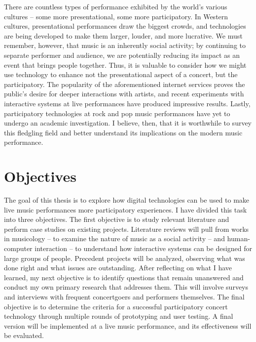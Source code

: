 There are countless types of performance exhibited by the world's various cultures -- some more presentational, some more participatory. In Western cultures, presentational performances draw the biggest crowds, and technologies are being developed to make them larger, louder, and more lucrative. We must remember, however, that music is an inherently social activity; by continuing to separate performer and audience, we are potentially reducing its impact as an event that brings people together. Thus, it is valuable to consider how we might use technology to enhance not the presentational aspect of a concert, but the participatory. The popularity of the aforementioned internet services proves the public's desire for deeper interactions with artists, and recent experiments with interactive systems at live performances have produced impressive results. Lastly, participatory technologies at rock and pop music performances have yet to undergo an academic investigation. I believe, then, that it is worthwhile to survey this fledgling field and better understand its implications on the modern music performance.



\section{Objectives}

The goal of this thesis is to explore how digital technologies can be used to make live music performances more participatory experiences. I have divided this task into three objectives. The first objective is to study relevant literature and perform case studies on existing projects. Literature reviews will pull from works in musicology -- to examine the nature of music as a social activity -- and human-computer interaction -- to understand how interactive systems can be designed for large groups of people. Precedent projects will be analyzed, observing what was done right and what issues are outstanding. After reflecting on what I have learned, my next objective is to identify questions that remain unanswered and conduct my own primary research that addresses them. This will involve surveys and interviews with frequent concertgoers and performers themselves. The final objective is to determine the criteria for a successful participatory concert technology through multiple rounds of prototyping and user testing. A final version will be implemented at a live music performance, and its effectiveness will be evaluated.

